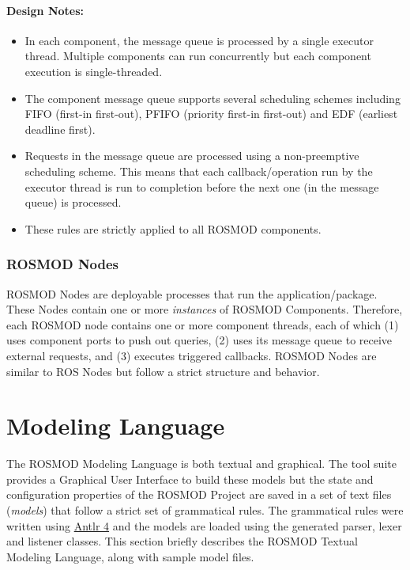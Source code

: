 \documentclass[letterpaper,10pt,english]{sphinxmanual}
\begin{document}
\paragraph{Design Notes:}
\label{Introduction:design-notes}\begin{itemize}
\item {} 
In each component, the message queue is processed by a single executor thread. Multiple components can run concurrently but each component execution is single-threaded.

\item {} 
The component message queue supports several scheduling schemes including FIFO (first-in first-out), PFIFO (priority first-in first-out) and EDF (earliest deadline first).

\item {} 
Requests in the message queue are processed using a non-preemptive scheduling scheme. This means that each callback/operation run by the executor thread is run to completion before the next one (in the message queue) is processed.

\item {} 
These rules are strictly applied to all ROSMOD components.

\end{itemize}


\subsubsection{ROSMOD Nodes}
\label{Introduction:rosmod-nodes}
ROSMOD Nodes are deployable processes that run the application/package. These Nodes contain one or more \emph{instances} of ROSMOD Components. Therefore, each ROSMOD node contains one or more component threads, each of which (1) uses component ports to push out queries, (2) uses its message queue to receive external requests, and (3) executes triggered callbacks. ROSMOD Nodes are similar to ROS Nodes but follow a strict structure and behavior.


\section{Modeling Language}
\label{Modeling_Language:modeling-language}\label{Modeling_Language::doc}
The ROSMOD Modeling Language is both textual and graphical. The tool suite provides a Graphical User Interface to build these models but the state and configuration properties of the ROSMOD Project are saved in a set of text files (\emph{models}) that follow a strict set of grammatical rules. The grammatical rules were written using \href{http://www.antlr.org/}{Antlr 4} and the models are loaded using the generated parser, lexer and listener classes. This section briefly describes the ROSMOD Textual Modeling Language, along with sample model files.
\end{document}
